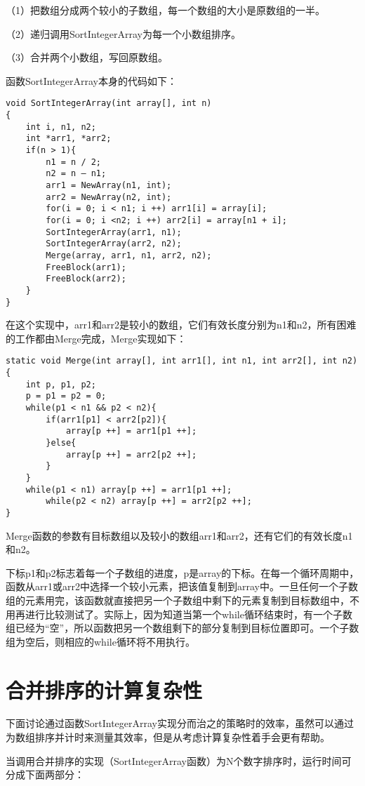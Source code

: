 （1）把数组分成两个较小的子数组，每一个数组的大小是原数组的一半。

（2）递归调用SortIntegerArray为每一个小数组排序。

（3）合并两个小数组，写回原数组。

函数SortIntegerArray本身的代码如下：
\begin{verbatim}
void SortIntegerArray(int array[], int n)
{
    int i, n1, n2;
    int *arr1, *arr2;
    if(n > 1){
        n1 = n / 2;
        n2 = n – n1;
        arr1 = NewArray(n1, int);
        arr2 = NewArray(n2, int);
        for(i = 0; i < n1; i ++) arr1[i] = array[i];
        for(i = 0; i <n2; i ++) arr2[i] = array[n1 + i];
        SortIntegerArray(arr1, n1);
        SortIntegerArray(arr2, n2);
        Merge(array, arr1, n1, arr2, n2);
        FreeBlock(arr1);
        FreeBlock(arr2);
    }
}
\end{verbatim}
在这个实现中，arr1和arr2是较小的数组，它们有效长度分别为n1和n2，所有困难的工作都由Merge完成，Merge实现如下：
\begin{verbatim}
static void Merge(int array[], int arr1[], int n1, int arr2[], int n2)
{
    int p, p1, p2;
    p = p1 = p2 = 0;
    while(p1 < n1 && p2 < n2){
        if(arr1[p1] < arr2[p2]){
            array[p ++] = arr1[p1 ++];
        }else{
            array[p ++] = arr2[p2 ++];
        }
    }
    while(p1 < n1) array[p ++] = arr1[p1 ++];
        while(p2 < n2) array[p ++] = arr2[p2 ++];
}
\end{verbatim}
Merge函数的参数有目标数组以及较小的数组arr1和arr2，还有它们的有效长度n1和n2。

下标p1和p2标志着每一个子数组的进度，p是array的下标。在每一个循环周期中，函数从arr1或arr2中选择一个较小元素，把该值复制到array中。一旦任何一个子数组的元素用完，该函数就直接把另一个子数组中剩下的元素复制到目标数组中，不用再进行比较测试了。实际上，因为知道当第一个while循环结束时，有一个子数组已经为“空”，所以函数把另一个数组剩下的部分复制到目标位置即可。一个子数组为空后，则相应的while循环将不用执行。

\section{合并排序的计算复杂性}

下面讨论通过函数SortIntegerArray实现分而治之的策略时的效率，虽然可以通过为数组排序并计时来测量其效率，但是从考虑计算复杂性着手会更有帮助。

当调用合并排序的实现（SortIntegerArray函数）为N个数字排序时，运行时间可分成下面两部分：

